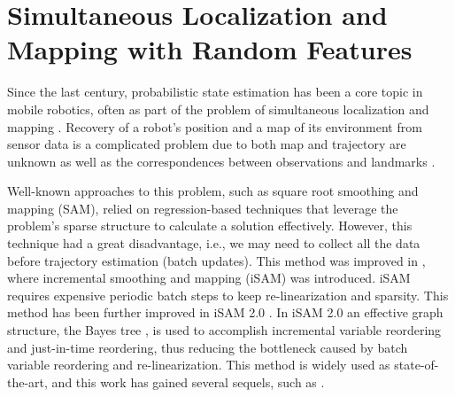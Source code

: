 \section{Simultaneous Localization and Mapping with Random Features}
\label{sec:SLAM}

Since the last century, probabilistic state estimation has been a core topic in mobile robotics, often as part of the problem of simultaneous localization and mapping \cite{bailey2006simultaneous,durrant2006simultaneous}.
Recovery of a robot's position and a map of its environment from sensor data is a complicated problem due to both map and trajectory are unknown as well as the correspondences between observations and landmarks \cite{probabilistic}.

Well-known approaches to this problem, such as square root smoothing and mapping (SAM)\cite{SAM},
relied on regression-based techniques that leverage the problem's sparse structure to calculate a solution effectively.
However, this technique had a great disadvantage, i.e., we may need to collect all the data before trajectory estimation (batch updates)\cite{FASTisam}.
This method was improved in \cite{isam}, where incremental smoothing and mapping  (iSAM) was introduced.
iSAM requires expensive periodic batch steps to keep re-linearization and sparsity.
This method has been further improved in iSAM 2.0 \cite{isam2}. In iSAM 2.0 an effective graph structure,
the Bayes tree \cite{bayes}, is used to accomplish incremental variable reordering and just-in-time reordering,
thus reducing the bottleneck caused by batch variable reordering and re-linearization.
This method is widely used as state-of-the-art, and this work has gained several sequels, such as \cite{1sam, 2sam,3sam,4sam}.

